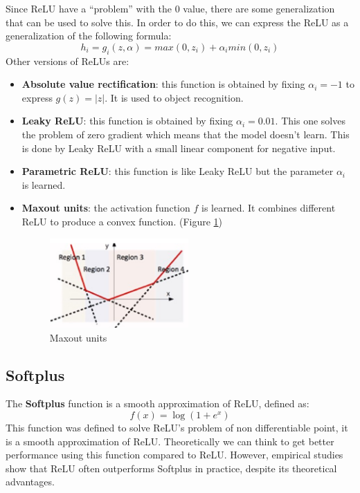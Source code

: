 Since ReLU have a ``problem'' with the $0$ value, there are some generalization
that can be used to solve this. In order to do this, we can express the ReLU as
a generalization of the following formula:
\begin{equation}
    h_i = g_i(z,\alpha) = max(0,z_i) + \alpha_i min(0, z_i)
\end{equation}
Other versions of ReLUs are:
\begin{itemize}
    \item \textbf{Absolute value rectification}: this function is obtained by
          fixing $\alpha_i = -1$ to express $g(z) = |z|$. It is used to object
          recognition.
    \item \textbf{Leaky ReLU}: this function is obtained by fixing $\alpha_i = 0.01$.
          This one solves the problem of zero gradient which means that the model
          doesn't learn. This is done by Leaky ReLU with a small linear component
          for negative input.
    \item \textbf{Parametric ReLU}: this function is like Leaky ReLU but the
          parameter $\alpha_i$ is learned.
    \item \textbf{Maxout units}: the activation function $f$ is learned. It
          combines different ReLU to produce a convex function. (Figure \ref{fig:Maxout})
          \begin{figure}[!ht]
                \centering
                \includegraphics[width=0.5\textwidth]{img/maxout.png}
                \caption{Maxout units}
                \label{fig:Maxout}
          \end{figure}
\end{itemize}
\subsection{Softplus}
The \textbf{Softplus} function is a smooth approximation of ReLU, defined as:
\begin{equation}
    f(x) = \log(1+e^x)
\end{equation}
This function was defined to solve ReLU's problem of non differentiable point,
it is a smooth approximation of ReLU. Theoretically we can think to get better
performance using this function compared to ReLU. However, empirical studies show
that ReLU often outperforms Softplus in practice, despite its theoretical advantages.

